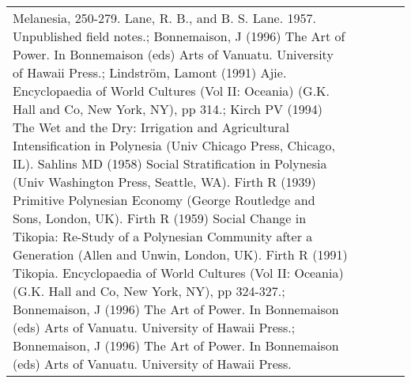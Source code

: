 \begin{longtable}{p{5cm}p{2cm}p{2cm}p{2cm}p{2cm}}
Melanesia, 250-279. Lane, R. B., and B. S. Lane. 1957. Unpublished field notes.; Bonnemaison, J (1996) The Art of Power. In Bonnemaison (eds) Arts of Vanuatu. University of Hawaii Press.; Lindström, Lamont (1991) Ajie. Encyclopaedia of World Cultures (Vol II: Oceania) (G.K. Hall and Co, New York, NY), pp 314.; Kirch PV (1994) The Wet and the Dry: Irrigation and Agricultural Intensification in Polynesia (Univ Chicago Press, Chicago, IL). Sahlins MD (1958) Social Stratification in Polynesia (Univ Washington Press, Seattle, WA). Firth R (1939) Primitive Polynesian Economy (George Routledge and Sons, London, UK). Firth R (1959) Social Change in Tikopia: Re-Study of a Polynesian Community after a Generation (Allen and Unwin, London, UK). Firth R (1991) Tikopia. Encyclopaedia of World Cultures (Vol II: Oceania) (G.K. Hall and Co, New York, NY), pp 324-327.; Bonnemaison, J (1996) The Art of Power. In Bonnemaison (eds) Arts of Vanuatu. University of Hawaii Press.; Bonnemaison, J (1996) The Art of Power. In Bonnemaison (eds) Arts of Vanuatu. University of Hawaii Press. \\ 

\end{longtable}
